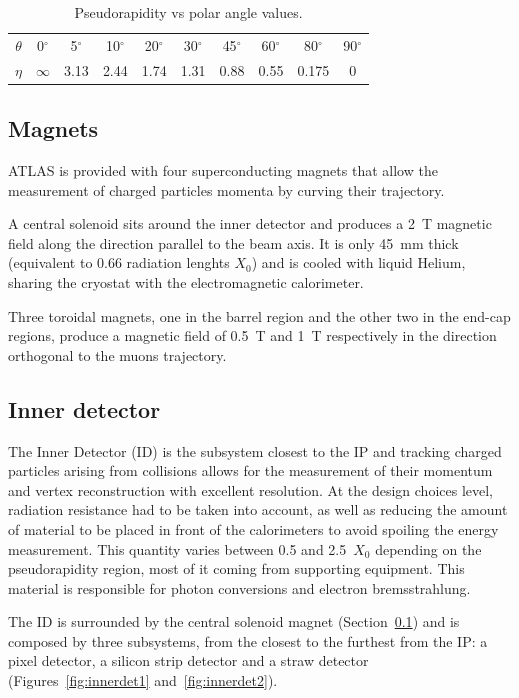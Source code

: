 \begin{table}[htb]\centering\begin{tabular}{cccccccccc}\toprule
$\theta$ & 0$^{\circ}$ & 5$^{\circ}$ & 10$^{\circ}$ & 20$^{\circ}$ & 30$^{\circ}$ & 45$^{\circ}$ & 60$^{\circ}$ & 80$^{\circ}$ & 90$^{\circ}$ \\
$\eta$ & $\infty$ & 3.13 & 2.44 & 1.74 & 1.31 & 0.88 & 0.55 & 0.175 & 0\\\bottomrule \end{tabular}
\caption{Pseudorapidity vs polar angle values.}\label{tab:etatheta}\end{table}

\subsection{Magnets}\label{sec:magnets}

ATLAS is provided with four superconducting magnets that allow the measurement of
charged particles momenta by curving their trajectory. 

A central solenoid sits 
around the inner detector and produces a 2~T magnetic field along the direction
parallel to the beam axis. It is only 45~mm thick (equivalent to 0.66 radiation lenghts $X_0$)
and is cooled with liquid Helium, sharing the cryostat with the electromagnetic calorimeter.

Three toroidal magnets, one in the barrel region and the other two in the end-cap regions,
produce a magnetic field of 0.5~T and 1~T respectively in the direction orthogonal to the muons trajectory.

\subsection{Inner detector}\label{sec:innerdet}

The Inner Detector (ID) is the subsystem closest to the IP and tracking charged particles arising from collisions allows for 
the measurement of their momentum and vertex reconstruction with excellent resolution. At the design choices level, radiation resistance had to
be taken into account, as well as reducing the amount of material to be placed in front of the calorimeters to avoid spoiling the energy measurement.
This quantity varies between 0.5 and 2.5~$X_0$ depending on the pseudorapidity region, most of it coming from supporting equipment. This material
is responsible for photon conversions and electron bremsstrahlung.

The ID is surrounded by the central solenoid magnet (Section~\ref{sec:magnets}) and is composed by three subsystems, 
from the closest to the furthest from the IP: a pixel detector, a silicon strip detector and
a straw detector (Figures~\ref{fig:innerdet1} and~\ref{fig:innerdet2}).


